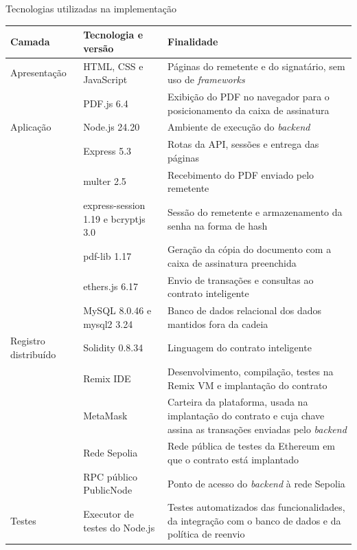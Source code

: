 \documentclass[
    12pt,
    a4paper,
    oneside,
    chapter=TITLE,
    section=TITLE,
    subsection=TITLE,
    subsubsection=TITLE,
    sumario=tradicional,
    english,
    brazil
]{abntex2}
\begin{document}
\begin{quadro}[htb]
    \caption{Tecnologias utilizadas na implementação}
    \label{quadro:tecnologias}
    \centering
    \small
    \begin{tabular}{L{2.5cm}L{4.0cm}L{8.0cm}}
        \toprule
        \textbf{Camada} & \textbf{Tecnologia e versão} & \textbf{Finalidade} \\
        \midrule
        Apresentação & HTML, CSS e JavaScript & Páginas do remetente e do signatário, sem uso de \emph{frameworks} \\
         & PDF.js 6.4 & Exibição do PDF no navegador para o posicionamento da caixa de assinatura \\
        \midrule
        Aplicação & Node.js 24.20 & Ambiente de execução do \emph{backend} \\
         & Express 5.3 & Rotas da API, sessões e entrega das páginas \\
         & multer 2.5 & Recebimento do PDF enviado pelo remetente \\
         & express-session 1.19 e bcryptjs 3.0 & Sessão do remetente e armazenamento da senha na forma de hash \\
         & pdf-lib 1.17 & Geração da cópia do documento com a caixa de assinatura preenchida \\
         & ethers.js 6.17 & Envio de transações e consultas ao contrato inteligente \\
         & MySQL 8.0.46 e mysql2 3.24 & Banco de dados relacional dos dados mantidos fora da cadeia \\
        \midrule
        Registro distribuído & Solidity 0.8.34 & Linguagem do contrato inteligente \\
         & Remix IDE & Desenvolvimento, compilação, testes na Remix VM e implantação do contrato \\
         & MetaMask & Carteira da plataforma, usada na implantação do contrato e cuja chave assina as transações enviadas pelo \emph{backend} \\
         & Rede Sepolia & Rede pública de testes da Ethereum em que o contrato está implantado \\
         & RPC público PublicNode & Ponto de acesso do \emph{backend} à rede Sepolia \\
        \midrule
        Testes & Executor de testes do Node.js & Testes automatizados das funcionalidades, da integração com o banco de dados e da política de reenvio \\
        \bottomrule
    \end{tabular}
\end{quadro}
\end{document}
